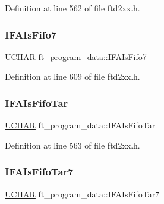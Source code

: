 Definition at line 562 of file ftd2xx.\+h.

\mbox{\label{structft__program__data_aada296f4be68214c88608cf1657e14bf}} 
\subsubsection{\texorpdfstring{I\+F\+A\+Is\+Fifo7}{IFAIsFifo7}}
{\footnotesize\ttfamily \hyperlink{CatCaloProto40MHz_2inc_2WinTypes_8h_a4f4bb67531a9bf6f0b9c6ad76aeba587}{U\+C\+H\+AR} ft\+\_\+program\+\_\+data\+::\+I\+F\+A\+Is\+Fifo7}



Definition at line 609 of file ftd2xx.\+h.

\mbox{\label{structft__program__data_a906ada3748a6e9ba1ff4cac63e159e9d}} 
\subsubsection{\texorpdfstring{I\+F\+A\+Is\+Fifo\+Tar}{IFAIsFifoTar}}
{\footnotesize\ttfamily \hyperlink{CatCaloProto40MHz_2inc_2WinTypes_8h_a4f4bb67531a9bf6f0b9c6ad76aeba587}{U\+C\+H\+AR} ft\+\_\+program\+\_\+data\+::\+I\+F\+A\+Is\+Fifo\+Tar}



Definition at line 563 of file ftd2xx.\+h.

\mbox{\label{structft__program__data_ad144fd874019e32cb625bd42d1177a1b}} 
\subsubsection{\texorpdfstring{I\+F\+A\+Is\+Fifo\+Tar7}{IFAIsFifoTar7}}
{\footnotesize\ttfamily \hyperlink{CatCaloProto40MHz_2inc_2WinTypes_8h_a4f4bb67531a9bf6f0b9c6ad76aeba587}{U\+C\+H\+AR} ft\+\_\+program\+\_\+data\+::\+I\+F\+A\+Is\+Fifo\+Tar7}



